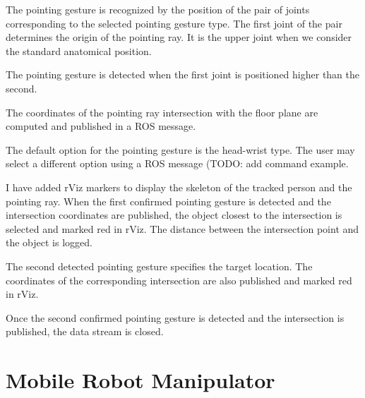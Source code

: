 The pointing gesture is recognized by the position of the pair of joints corresponding to the selected pointing gesture type. The first joint of the pair determines the origin of the pointing ray. It is the upper joint when we consider the standard anatomical position.\par
The pointing gesture is detected when the first joint is positioned higher than the second.\par
The coordinates of the pointing ray intersection with the floor plane are computed and published in a ROS message.\par
The default option for the pointing gesture is the head-wrist type. The user may select a different option using a ROS message (TODO: add command example.\par

I have added rViz markers to display the skeleton of the tracked person and the pointing ray. When the first confirmed pointing gesture is detected and the intersection coordinates are published, the object closest to the intersection is selected and marked red in rViz. The distance between the intersection point and the object is logged.\par
The second detected pointing gesture specifies the target location. The coordinates of the corresponding intersection are also published and marked red in rViz.\par
Once the second confirmed pointing gesture is detected and the intersection is published, the data stream is closed.\par


\section{Mobile Robot Manipulator}


